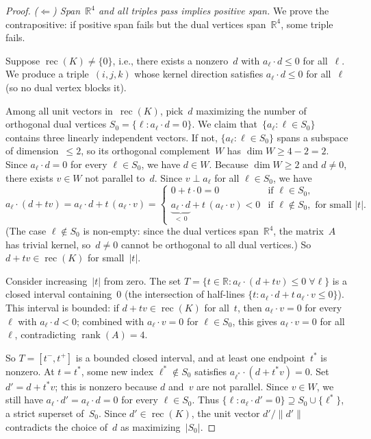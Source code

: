 \begin{unverified}
\begin{proof}
\medskip\noindent\emph{($\Leftarrow$) Span~$\mathbb{R}^4$ and all triples
pass implies positive span.}
We prove the contrapositive: if positive span fails but the dual vertices
span~$\mathbb{R}^4$, some triple fails.

Suppose $\operatorname{rec}(K) \neq \{0\}$, i.e., there exists a nonzero~$d$
with $a_\ell \cdot d \le 0$ for all~$\ell$. We produce a triple~$(i,j,k)$
whose kernel direction satisfies $a_\ell \cdot d \le 0$ for all~$\ell$
(so no dual vertex blocks it).

Among all unit vectors in~$\operatorname{rec}(K)$, pick~$d$ maximizing the
number of orthogonal dual vertices $S_0 = \{\ell : a_\ell \cdot d = 0\}$.  We claim
that~$\{a_\ell : \ell \in S_0\}$ contains three linearly independent vectors.
If not, $\{a_\ell : \ell \in S_0\}$ spans a subspace of dimension~$\le 2$,
so its orthogonal complement~$W$ has $\dim W \ge 4 - 2 = 2$.  Since
$a_\ell \cdot d = 0$ for every $\ell \in S_0$, we have $d \in W$.  Because
$\dim W \ge 2$ and $d \ne 0$, there exists $v \in W$ not parallel to~$d$.
Since $v \perp a_\ell$ for all $\ell \in S_0$, we have
\[
  a_\ell \cdot (d + tv) = a_\ell \cdot d + t\,(a_\ell \cdot v)
  = \begin{cases}
    0 + t \cdot 0 = 0 & \text{if } \ell \in S_0, \\
    \underbrace{a_\ell \cdot d}_{<\,0} + t\,(a_\ell \cdot v) < 0
    & \text{if } \ell \notin S_0, \text{ for small } |t|.
  \end{cases}
\]
(The case $\ell \notin S_0$ is non-empty: since the dual vertices span~$\mathbb{R}^4$,
the matrix~$A$ has trivial kernel, so~$d \ne 0$ cannot be orthogonal to all
dual vertices.)
So $d + tv \in \operatorname{rec}(K)$ for small~$|t|$.

Consider increasing~$|t|$ from zero.  The set
$T = \{t \in \mathbb{R} : a_\ell \cdot (d + tv) \le 0 \;\forall \ell\}$ is
a closed interval containing~$0$ (the intersection of half-lines
$\{t : a_\ell \cdot d + t\,a_\ell \cdot v \le 0\}$).  This interval is
bounded: if $d + tv \in \operatorname{rec}(K)$ for all~$t$, then
$a_\ell \cdot v = 0$ for every~$\ell$ with $a_\ell \cdot d < 0$; combined
with $a_\ell \cdot v = 0$ for $\ell \in S_0$, this gives $a_\ell \cdot v = 0$
for all~$\ell$, contradicting $\operatorname{rank}(A) = 4$.

So $T = [t^-, t^+]$ is a bounded closed interval, and at least one
endpoint~$t^*$ is nonzero.  At $t = t^*$, some new index
$\ell^* \notin S_0$ satisfies $a_{\ell^*} \cdot (d + t^* v) = 0$.  Set
$d' = d + t^* v$; this is nonzero because $d$ and~$v$ are not parallel.
Since $v \in W$, we still have $a_\ell \cdot d' = a_\ell \cdot d = 0$
for every $\ell \in S_0$.  Thus
$\{\ell : a_\ell \cdot d' = 0\} \supseteq S_0 \cup \{\ell^*\}$,
a strict superset of~$S_0$.  Since $d' \in \operatorname{rec}(K)$, the unit
vector $d' / \|d'\|$ contradicts the choice of~$d$ as maximizing~$|S_0|$.


\end{proof}
\end{unverified}
